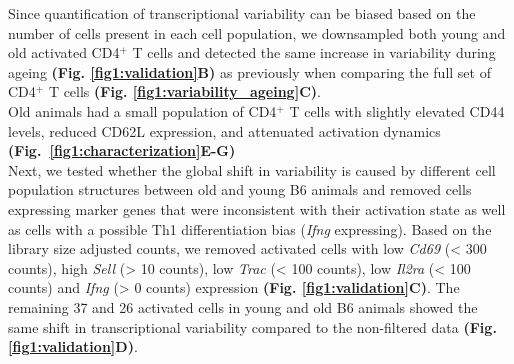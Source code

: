 Since quantification of transcriptional variability can be biased based on the number of cells present in each cell population, we downsampled both young and old activated CD4$^+$ T cells and detected the same increase in variability during ageing \textbf{(Fig. \ref{fig1:validation}B)} as previously when comparing the full set of CD4$^+$ T cells \textbf{(Fig. \ref{fig1:variability_ageing}C)}. \\

Old animals had a small population of CD4$^+$ T cells with slightly elevated CD44 levels, reduced CD62L expression, and attenuated activation dynamics \textbf{(Fig.~\ref{fig1:characterization}E-G)}\\

Next, we tested whether the global shift in variability is caused by different cell population structures between old and young B6 animals and removed cells expressing marker genes that were inconsistent with their activation state as well as cells with a possible Th1 differentiation bias (\textit{Ifng} expressing). Based on the library size adjusted counts, we removed activated cells with low \textit{Cd69} (< 300 counts), high \textit{Sell} (> 10 counts), low \textit{Trac} (< 100 counts), low \textit{Il2ra} (< 100 counts) and \textit{Ifng} (> 0 counts) expression \textbf{(Fig. \ref{fig1:validation}C)}. The remaining 37 and 26 activated cells in young and old B6 animals showed the same shift in transcriptional variability compared to the non-filtered data \textbf{(Fig. \ref{fig1:validation}D)}. \\

